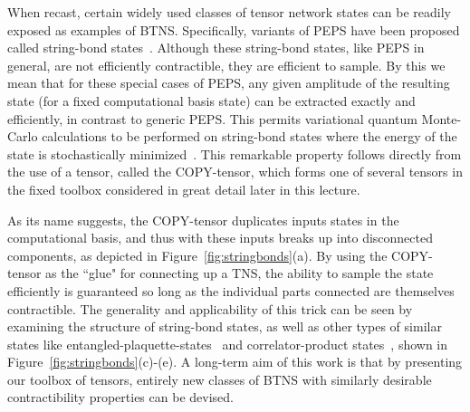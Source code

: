 \begin{remark}
 When recast, certain widely used classes of tensor network states can be readily exposed
as examples of BTNS. Specifically, variants of PEPS have been proposed called
string-bond states~\cite{PhysRevLett.100.040501}.  Although these string-bond states,
like PEPS in general, are not efficiently contractible, they are efficient to sample. By this we mean that for
these special cases of PEPS, any given amplitude of the resulting state (for a fixed computational basis state) can be extracted exactly and efficiently,
in contrast to generic PEPS. This permits variational quantum Monte-Carlo calculations to be performed on string-bond states 
where the energy of the state is stochastically
minimized~\cite{PhysRevLett.100.040501}. This remarkable property
follows directly from the use of a tensor, 
called the {\sf COPY}-tensor, which forms one of several tensors in the fixed
toolbox considered in great detail later in this lecture. 

As its name suggests, the {\sf COPY}-tensor
duplicates inputs states in the computational basis, and thus with these inputs
breaks up into disconnected components, as depicted in
Figure~\ref{fig:stringbonds}(a). By using the
{\sf COPY}-tensor as the ``glue" for connecting up a TNS, the ability to sample the
state efficiently is guaranteed so long as the individual parts connected are themselves
contractible. The generality and applicability of this trick can be seen by examining
the structure of string-bond states, as well as other types of 
similar states like entangled-plaquette-states~\cite{2009NJPh...11h3026M} and
correlator-product states~\cite{2009PhRvB..80x5116C}, shown in Figure~\ref{fig:stringbonds}(c)-(e).  
A long-term aim of this work is that by presenting our toolbox of
tensors, entirely new classes of BTNS with similarly desirable contractibility
properties can be devised. 
\end{remark}
